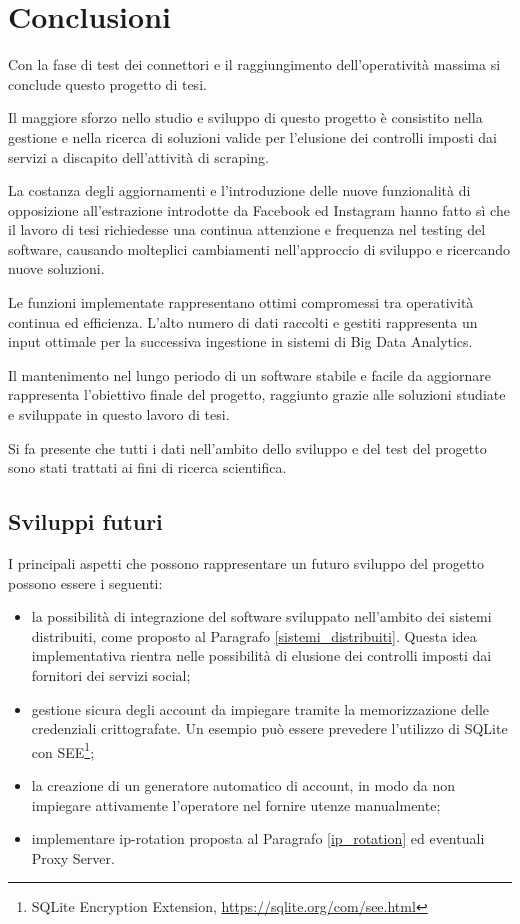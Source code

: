 \chapter{Conclusioni}\label{chap:conclusioni}
Con la fase di test dei connettori e il raggiungimento dell'operativit\`a massima si conclude questo progetto di tesi.

Il maggiore sforzo nello studio e sviluppo di questo progetto \`e consistito nella gestione e nella ricerca di soluzioni valide per l'elusione dei controlli imposti dai servizi a discapito dell'attivit\`a di scraping.

La costanza degli aggiornamenti e l'introduzione delle nuove funzionalit\`a di opposizione all'estrazione introdotte da Facebook ed Instagram hanno fatto s\`i che il lavoro di tesi richiedesse una continua attenzione e frequenza nel testing del software, causando molteplici cambiamenti nell'approccio di sviluppo e ricercando nuove soluzioni.

Le funzioni implementate rappresentano ottimi compromessi tra operativit\`a continua ed efficienza. L'alto numero di dati raccolti e gestiti rappresenta un input ottimale per la successiva ingestione in sistemi di Big Data Analytics. 

Il mantenimento nel lungo periodo di un software stabile e facile da aggiornare rappresenta l'obiettivo finale del progetto, raggiunto grazie alle soluzioni studiate e sviluppate in questo lavoro di tesi.

Si fa presente che tutti i dati nell'ambito dello sviluppo e del test del progetto sono stati trattati ai fini di ricerca scientifica.

\section{Sviluppi futuri}
I principali aspetti che possono rappresentare un futuro sviluppo del progetto possono essere i seguenti:
\begin{itemize}
    \item la possibilit\`a di integrazione del software sviluppato nell'ambito dei sistemi distribuiti, come proposto al Paragrafo \ref{sistemi_distribuiti}. Questa idea implementativa rientra nelle possibilit\`a di elusione dei controlli imposti dai fornitori dei servizi social;
    \item gestione sicura degli account da impiegare tramite la memorizzazione delle credenziali crittografate. Un esempio pu\`o essere prevedere l'utilizzo di SQLite con SEE\footnote{SQLite Encryption Extension, \url{https://sqlite.org/com/see.html}}; 
    \item la creazione di un generatore automatico di account, in modo da non impiegare attivamente l'operatore nel fornire utenze manualmente;
    \item implementare ip-rotation proposta al Paragrafo \ref{ip_rotation} ed eventuali Proxy Server.
\end{itemize}


